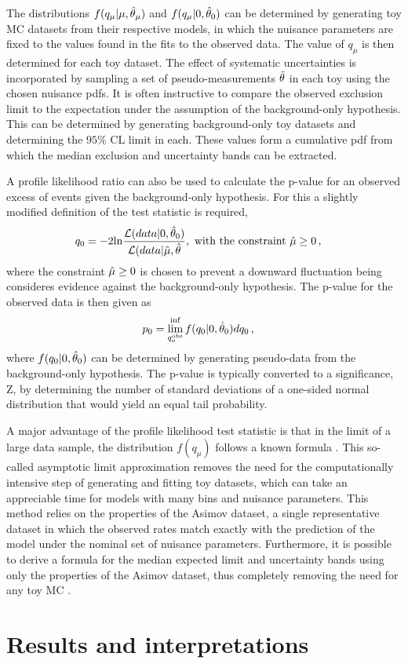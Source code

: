 The distributions $f(q_{\mu}|\mu,\Hat{\theta}_{\mu})$ and $f(q_{\mu}|0,\Hat{\theta}_0)$ can be determined by generating toy MC datasets from their respective models, in which the nuisance parameters are fixed to the values found in the fits to the observed data. The value of $q_{\mu}$ is then determined for each toy dataset. The effect of systematic uncertainties is incorporated by sampling a set of pseudo-measurements $\Tilde{\theta}$ in each toy using the chosen nuisance pdfs. It is often instructive to compare the observed exclusion limit to the expectation under the assumption of the background-only hypothesis. This can be determined by generating background-only toy datasets and determining the $95\%$ CL limit in each. These values form a cumulative pdf from which the median exclusion and uncertainty bands can be extracted.

A profile likelihood ratio can also be used to calculate the p-value for an observed excess of events given the background-only hypothesis. For this a slightly modified definition of the test statistic is required,
\begin{equation}
    q_0 = -2 \mathrm{ln}\frac{\Lagr(data|0, \Hat{\theta}_0)}{\Lagr(data|\Hat{\mu}, \Hat{\theta}}, \text{ with the constraint }\Hat{\mu} \geq 0\msep 
\end{equation}
where the constraint $\Hat{\mu} \geq 0$ is chosen to prevent a downward fluctuation being consideres evidence against the background-only hypothesis. The p-value for the observed data is then given as
\begin{equation}
    p_0 = \lim^{\inf}_{q_o^{\mathrm{obs}}} f(q_0 | 0, \Hat{\theta}_0) dq_0\msep
\end{equation}
where $f(q_0 | 0, \Hat{\theta}_0)$ can be determined by generating pseudo-data from the background-only hypothesis. The p-value is typically converted to a significance, Z, by determining the number of standard deviations of a one-sided normal distribution that would yield an equal tail probability.

A major advantage of the profile likelihood test statistic is that in the limit of a large data sample, the distribution $f(q_{\mu})$ follows a known formula \cite{Carena2013}. This so-called asymptotic limit approximation removes the need for the computationally intensive step of generating and fitting toy datasets, which can take an appreciable time for models with many bins and nuisance parameters. This method relies on the properties of the Asimov dataset, a single representative dataset in which the observed rates match exactly with the prediction of the model under the nominal set of nuisance parameters. Furthermore, it is possible to derive a formula for the median expected limit and uncertainty bands using only the properties of the Asimov dataset, thus completely removing the need for any toy MC \cite{Carena2013}.

\section{Results and interpretations}
\label{sec:analysis_results}

